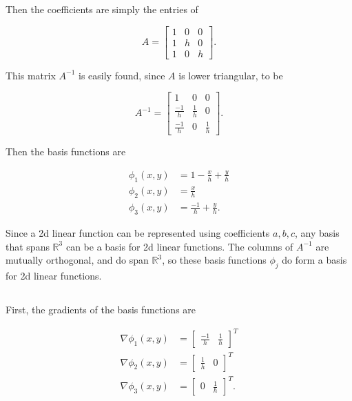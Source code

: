 \documentclass{hw-template}
\begin{document}
Then the coefficients are simply the entries of 

\begin{equation}
    A = \begin{bmatrix}
        1 & 0 & 0\\
        1 & h & 0\\
        1 & 0 & h
    \end{bmatrix}.
\end{equation}

This matrix $A^{-1}$ is easily found, since $A$ is lower triangular, to be

\begin{equation}
    A^{-1} = \begin{bmatrix}
        1 & 0 & 0\\
        \frac{-1}{h} & \frac{1}{h} & 0\\
        \frac{-1}{h} & 0 & \frac{1}{h}
    \end{bmatrix}.
\end{equation}

Then the basis functions are 

\begin{align}
    \phi_1(x, y) &= 1 - \frac{x}{h} + \frac{y}{h}\\
    \phi_2(x, y) &= \frac{x}{h}\\
    \phi_3(x, y) &= \frac{-1}{h}+ \frac{y}{h}.
\end{align}

Since a 2d linear function can be represented using coefficients $a, b, c$, any basis that spans $\mathbb{R}^3$ can be a basis for 2d linear functions. The columns of $A^{-1}$ are mutually orthogonal, and do span $\mathbb{R}^3$, so these basis functions $\phi_j$ do form a basis for 2d linear functions.

\subsection{} First, the gradients of the basis functions are 

\begin{align}
    \nabla\phi_1(x, y) &= \begin{bmatrix}
        \frac{-1}{h} & \frac{1}{h}
    \end{bmatrix}^T\\
    \nabla\phi_2(x, y) &= \begin{bmatrix}
        \frac{1}{h} & 0
    \end{bmatrix}^T\\
    \nabla\phi_3(x, y) &= \begin{bmatrix}
        0 & \frac{1}{h}
    \end{bmatrix}^T.
\end{align}
\end{document}

